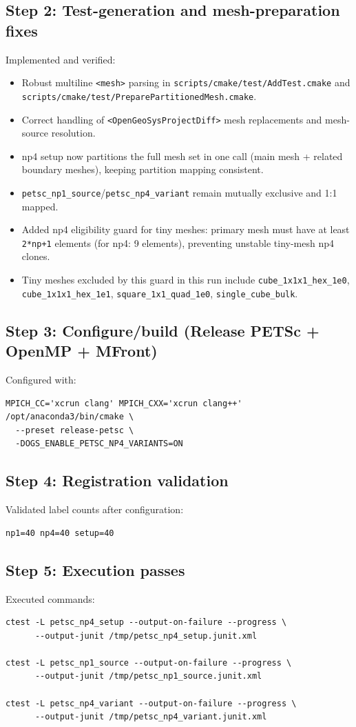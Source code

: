 \documentclass[a4paper,11pt]{article}
\begin{document}
\subsection*{Step 2: Test-generation and mesh-preparation fixes}
Implemented and verified:
\begin{itemize}
\item Robust multiline \texttt{<mesh>} parsing in
\texttt{scripts/cmake/test/AddTest.cmake} and
\texttt{scripts/cmake/test/PreparePartitionedMesh.cmake}.
\item Correct handling of \texttt{<OpenGeoSysProjectDiff>} mesh replacements and mesh-source resolution.
\item np4 setup now partitions the full mesh set in one call (main mesh + related boundary meshes), keeping partition mapping consistent.
\item \texttt{petsc\_np1\_source}/\texttt{petsc\_np4\_variant} remain mutually exclusive and 1:1 mapped.
\item Added np4 eligibility guard for tiny meshes: primary mesh must have at least
\texttt{2*np+1} elements (for np4: 9 elements), preventing unstable tiny-mesh np4 clones.
\item Tiny meshes excluded by this guard in this run include
\texttt{cube\_1x1x1\_hex\_1e0},
\texttt{cube\_1x1x1\_hex\_1e1},
\texttt{square\_1x1\_quad\_1e0},
\texttt{single\_cube\_bulk}.
\end{itemize}

\subsection*{Step 3: Configure/build (Release PETSc + OpenMP + MFront)}
Configured with:
\begin{verbatim}
MPICH_CC='xcrun clang' MPICH_CXX='xcrun clang++' /opt/anaconda3/bin/cmake \
  --preset release-petsc \
  -DOGS_ENABLE_PETSC_NP4_VARIANTS=ON
\end{verbatim}

\subsection*{Step 4: Registration validation}
Validated label counts after configuration:
\begin{verbatim}
np1=40 np4=40 setup=40
\end{verbatim}

\subsection*{Step 5: Execution passes}
Executed commands:
\begin{verbatim}
ctest -L petsc_np4_setup --output-on-failure --progress \
      --output-junit /tmp/petsc_np4_setup.junit.xml

ctest -L petsc_np1_source --output-on-failure --progress \
      --output-junit /tmp/petsc_np1_source.junit.xml

ctest -L petsc_np4_variant --output-on-failure --progress \
      --output-junit /tmp/petsc_np4_variant.junit.xml
\end{verbatim}
\end{document}
